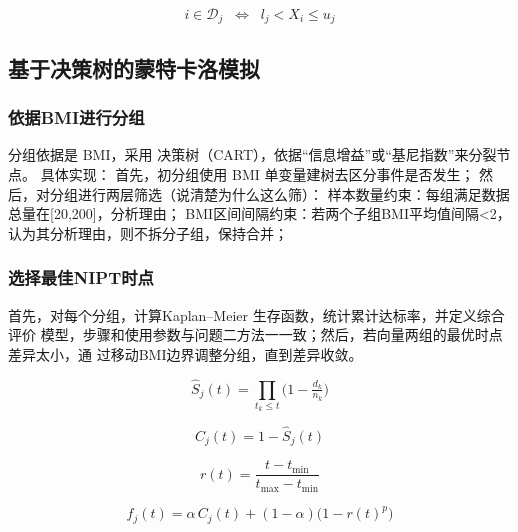 \documentclass[withoutpreface,notoc]{cumcmthesis}
\begin{document}
	\begin{equation*}
		i\in \mathcal{D}_j \;\;\Leftrightarrow\;\; l_j < X_i \le u_j
	\end{equation*}









	\subsection{基于决策树的蒙特卡洛模拟}


	
	\subsubsection{依据BMI进行分组}

	分组依据是 BMI，采用 决策树（CART），依据“信息增益”或“基尼指数”来分裂节点。
	具体实现：
	首先，初分组使用 BMI 单变量建树去区分事件是否发生；
	然后，对分组进行两层筛选（说清楚为什么这么筛）：
	样本数量约束：每组满足数据总量在[20,200]，分析理由；
	BMI区间间隔约束：若两个子组BMI平均值间隔<2，认为其分析理由，则不拆分子组，保持合并；


	\subsubsection{选择最佳NIPT时点}

	首先，对每个分组，计算Kaplan–Meier 生存函数，统计累计达标率，并定义综合评价
	模型，步骤和使用参数与问题二方法一一致；然后，若向量两组的最优时点差异太小，通
	过移动BMI边界调整分组，直到差异收敛。

	\begin{equation*}
		\hat S_j(t) = \prod_{t_k \le t} \Big(1 - \tfrac{d_k}{n_k}\Big)
	\end{equation*}

	\begin{equation*}
		C_j(t) = 1 - \hat S_j(t)
	\end{equation*}



	\begin{equation*}
		r(t) = \frac{t-t_{\min}}{t_{\max}-t_{\min}}
	\end{equation*}

	\begin{equation*}
		f_j(t)=\alpha\, C_j(t) + (1-\alpha)\big(1-r(t)^p\big)
	\end{equation*}
	
\end{document}
